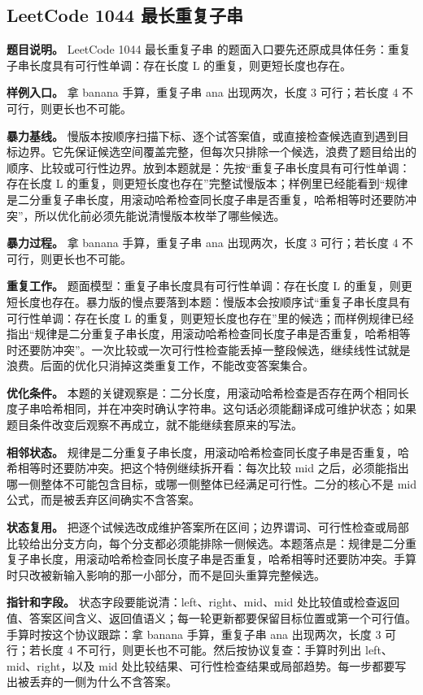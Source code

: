 \subsection{LeetCode 1044 最长重复子串}

\textbf{题目说明。} LeetCode 1044 最长重复子串 的题面入口要先还原成具体任务：重复子串长度具有可行性单调：存在长度 L 的重复，则更短长度也存在。

\textbf{样例入口。} 拿 banana 手算，重复子串 ana 出现两次，长度 3 可行；若长度 4 不可行，则更长也不可能。

\textbf{暴力基线。} 慢版本按顺序扫描下标、逐个试答案值，或直接检查候选直到遇到目标边界。它先保证候选空间覆盖完整，但每次只排除一个候选，浪费了题目给出的顺序、比较或可行性边界。放到本题就是：先按“重复子串长度具有可行性单调：存在长度 L 的重复，则更短长度也存在”完整试慢版本；样例里已经能看到“规律是二分重复子串长度，用滚动哈希检查同长度子串是否重复，哈希相等时还要防冲突”，所以优化前必须先能说清慢版本枚举了哪些候选。

\textbf{暴力过程。} 拿 banana 手算，重复子串 ana 出现两次，长度 3 可行；若长度 4 不可行，则更长也不可能。

\textbf{重复工作。} 题面模型：重复子串长度具有可行性单调：存在长度 L 的重复，则更短长度也存在。暴力版的慢点要落到本题：慢版本会按顺序试“重复子串长度具有可行性单调：存在长度 L 的重复，则更短长度也存在”里的候选；而样例规律已经指出“规律是二分重复子串长度，用滚动哈希检查同长度子串是否重复，哈希相等时还要防冲突”。一次比较或一次可行性检查能丢掉一整段候选，继续线性试就是浪费。后面的优化只消掉这类重复工作，不能改变答案集合。

\textbf{优化条件。} 本题的关键观察是：二分长度，用滚动哈希检查是否存在两个相同长度子串哈希相同，并在冲突时确认字符串。这句话必须能翻译成可维护状态；如果题目条件改变后观察不再成立，就不能继续套原来的写法。

\textbf{相邻状态。} 规律是二分重复子串长度，用滚动哈希检查同长度子串是否重复，哈希相等时还要防冲突。把这个特例继续拆开看：每次比较 mid 之后，必须能指出哪一侧整体不可能包含目标，或哪一侧整体已经满足可行性。二分的核心不是 mid 公式，而是被丢弃区间确实不含答案。

\textbf{状态复用。} 把逐个试候选改成维护答案所在区间；边界谓词、可行性检查或局部比较给出分支方向，每个分支都必须能排除一侧候选。本题落点是：规律是二分重复子串长度，用滚动哈希检查同长度子串是否重复，哈希相等时还要防冲突。手算时只改被新输入影响的那一小部分，而不是回头重算完整候选。

\textbf{指针和字段。} 状态字段要能说清：left、right、mid、mid 处比较值或检查返回值、答案区间含义、返回值语义；每一轮更新都要保留目标位置或第一个可行值。手算时按这个协议跟踪：拿 banana 手算，重复子串 ana 出现两次，长度 3 可行；若长度 4 不可行，则更长也不可能。然后按协议复查：手算时列出 left、mid、right，以及 mid 处比较结果、可行性检查结果或局部趋势。每一步都要写出被丢弃的一侧为什么不含答案。

